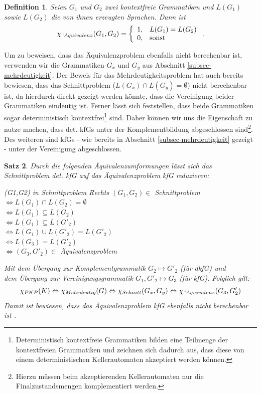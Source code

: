 \documentclass[]{scrartcl}
\newtheorem{definition}{Definition}[section]
\newtheorem{satz}[definition]{Satz}
\begin{document}
		\begin{definition}
			Seien $G_1$ und $G_2$ zwei kontextfreie Grammatiken und $L(G_1)$ sowie $L(G_2)$ die von ihnen erzeugten Sprachen. Dann ist
			\[
				\chi_{"Aquivalenz}(G_1, G_2)=\left\{\begin{array}{ll} 1, & L(G_1) = L(G_2) \\
							         0, &\text{sonst}\end{array}\right. .
			\]
		\end{definition}
		
		Um zu beweisen, dass das Äquivalenzproblem ebenfalls nicht berechenbar ist, verwenden wir die Grammatiken $G_x$ und $G_y$ aus Abschnitt \ref{subsec-mehrdeutigkeit}. Der Beweis für das Mehrdeutigkeitsproblem hat auch bereits bewiesen, dass das Schnittproblem ($L(G_x) \cap L(G_y) = \emptyset$) nicht berechenbar ist, da hierdurch direkt gezeigt werden könnte, dass die Vereinigung beider Grammatiken eindeutig ist. Ferner lässt sich feststellen, dass beide Grammatiken sogar deterministisch kontextfrei\footnote{Deterministisch kontextfreie Grammatiken bilden eine Teilmenge der kontextfreien Grammatiken und zeichnen sich dadurch aus, dass diese von einem deterministischen Kellerautomaten akzeptiert werden können.} sind. Daher können wir uns die Eigenschaft zu nutze machen, dass det. kfGs unter der Komplementbildung abgeschlossen sind\footnote{Hierzu müssen beim akzeptierenden Kellerautomaten nur die Finalzustandsmengen komplementiert werden.}. Des weiteren sind kfGs - wie bereits in Abschnitt \ref{subsec-mehrdeutigkeit} gezeigt - unter der Vereinigung abgeschlossen.

		\begin{satz}
		\label{satz-aequivalenz}
			Durch die folgenden Äquivalenzumformungen lässt sich das Schnittproblem det. kfG auf das Äquivalenzproblem kfG reduzieren:
			
			\begin{tabbing}
				(G1,G2) in Schnittproblem \= Rechts \kill
				$(G_1, G_2) \in$ Schnittproblem \>$\Leftrightarrow L(G_1) \cap L(G_2) = \emptyset$ \\
												\>$\Leftrightarrow L(G_1) \subseteq \overline{L(G_2)}$ \\
												\>$\Leftrightarrow L(G_1) \subseteq L(G'_2)$ \\
												\>$\Leftrightarrow L(G_1) \cup L(G'_2) = L(G'_2)$ \\
												\>$\Leftrightarrow L(G_3) = L(G'_2)$ \\
												\>$\Leftrightarrow (G_3, G'_2) \in$ Äquivalenzproblem 
			\end{tabbing}
				Mit dem Übergang zur Komplementgrammatik $G_2 \mapsto G'_2$ (für dkfG) und\\				
				dem Übergang zur Vereinigungsgrammatik $G_1, G'_2 \mapsto G_3$ (für kfG).
			Folglich gilt:
			\[
				\chi_{PKP}(K) \Leftrightarrow \chi_{Mehrdeutig}(G) \Leftrightarrow \chi_{Schnitt}(G_x, G_y) \Leftrightarrow \chi_{"Aquivalenz}(G_3, G'_2)
			\]
			Damit ist bewiesen, dass das Äquivalenzproblem kfG ebenfalls nicht berechenbar ist \cite{schoening}.
		\end{satz}
\end{document}
